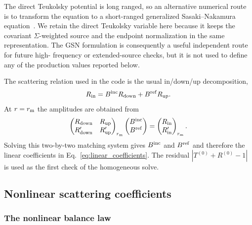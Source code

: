 \documentclass[aps,prd,twocolumn,10pt,nofootinbib,superscriptaddress,floatfix]{revtex4-2}
\newcommand{\Bin}{B^{\rm inc}}
\newcommand{\Bref}{B^{\rm ref}}
\begin{document}
The direct Teukolsky potential is long ranged, so an alternative numerical
route is to transform the equation to a short-ranged generalized
Sasaki--Nakamura equation~\cite{Hughes2000,Lo2023}.  We retain the direct
Teukolsky variable here because it keeps the covariant $\Sigma$-weighted
source and the endpoint normalization in the same representation.  The GSN
formulation is consequently a useful independent route for future high-
frequency or extended-source checks, but it is not used to define any of the
production values reported below.

The scattering relation used in the code is the usual in/down/up decomposition,
\begin{equation}
R_{\rm in}=\Bin R_{\rm down}+\Bref R_{\rm up}.
\label{eq:smatrix}
\end{equation}
At $r=r_{\rm m}$ the amplitudes are obtained from
\begin{equation}
\begin{pmatrix}
R_{\rm down} & R_{\rm up}\\
R_{\rm down}' & R_{\rm up}'
\end{pmatrix}_{r_{\rm m}}
\begin{pmatrix}\Bin\\ \Bref\end{pmatrix}
=
\begin{pmatrix}R_{\rm in}\\ R_{\rm in}'\end{pmatrix}_{r_{\rm m}} .
\label{eq:matching_matrix}
\end{equation}
Solving this two-by-two matching system gives $\Bin$ and $\Bref$ and therefore
the linear coefficients in Eq.~\eqref{eq:linear_coefficients}.  The residual
$|T^{(0)}+R^{(0)}-1|$ is used as the first check of the homogeneous solve.

\subsection{Nonlinear scattering coefficients}

\subsubsection{The nonlinear balance law}
\end{document}
